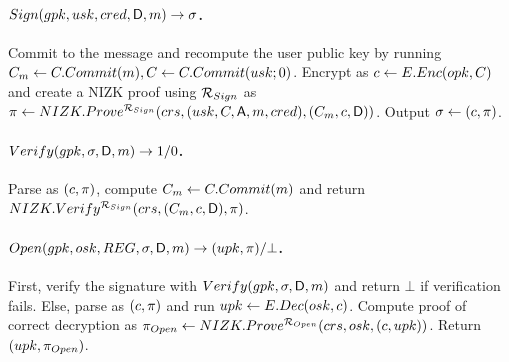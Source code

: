 \iffalse

\todo{This is not consistent with the $\langle \SBCMCom,\SBCMSign \rangle$
  definition...}
  
\begin{itemize}
\item \underline{User}: Commit to the user secret key by running $\Ccom \gets
  \CCommit(\usk)$. Generate proof $\NIZKproof \gets
  \NIZKProve^{\NIZKRel_{\Issue}}(\NIZKcrs,\usk,\Ccom)$. Send $(\Ccom,
  \NIZKproof)$ to the issuer.
\item \underline{Issuer}: Run $\NIZKVerify^{\NIZKRel_{\Issue}}(\NIZKcrs,
  \C,\NIZKproof)$, and return $\bot$ if it fails. Else, create the credential
  by computing $\SBCMsig \gets \SBCMSign(\isk,\C,\Attrs)$. Send \SBCMsig to the
  user, and output $\utrans \gets (\C,\SBCMsig,\Attrs,\NIZKproof)$.
\item \underline{User}: Check the signature by running $\SBCMVerify(\ipk,
  \SBCMsig,\Attrs \cup \lbrace \usk \rbrace)$, and return $\bot$ if
  verification fails. Otherwise, return $\cred \gets \SBCMsig$.
\end{itemize}
\fi

\paragraph{$Sign(gpk,usk,cred,\mathsf{D},m) \rightarrow \sigma$.} %
Commit to the message and recompute the user public key by running
$C_{m} \gets C.Commit(m), C \gets C.Commit(usk; 0)$.
Encrypt \Ccom as $c \gets E.Enc(opk,C)$ and create a NIZK proof using
$\mathcal{R}_{Sign}$ as $\pi \gets NIZK.Prove^{\mathcal{R}_{Sign}}
(crs,(usk,C,\mathsf{A},m,cred),
(C_{m},c,\mathsf{D}))$. Output $\sigma \gets (c,\pi)$.

\paragraph{$Verify(gpk,\sigma,\mathsf{D},m) \rightarrow 1/0$.} %
Parse \sig as $(c,\pi)$, compute $C_{m} \gets C.Commit(m)$ and
return $NIZK.Verify^{\mathcal{R}_{Sign}}(crs,(C_{m},c,\mathsf{D}),
\pi)$.

\paragraph{$\Open(\gpk,\osk,\trans,\sig,\DAttrs,\msg)
  \rightarrow (\upk,\oproof)/\bot$.} %
First, verify the signature with $Verify(gpk,\sigma,\mathsf{D},m)$ and
return $\bot$ if verification fails. Else, parse \sig as $(c,\pi)$
and run $upk \gets E.Dec(osk,c)$. Compute proof of correct decryption
as $\pi_{Open} \gets NIZK.Prove^{\mathcal{R}_{Open}}(crs,osk,(c,
upk))$. Return $(upk,\pi_{Open})$.

